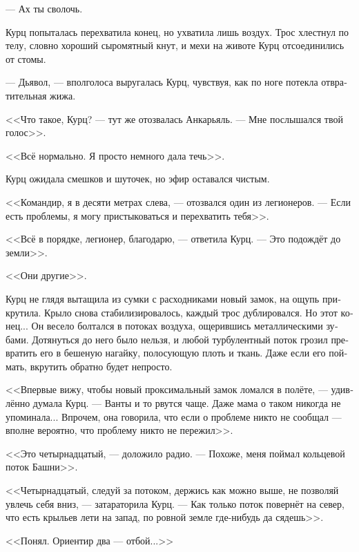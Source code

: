 \documentclass[a4paper,10pt,fleqn]{book}\usepackage{polyglossia}\setdefaultlanguage[babelshorthands=true]{russian}\setotherlanguage{english}\defaultfontfeatures{Ligatures=TeX,Mapping=tex-text}\usepackage{xcolor}\newcommand{\ml}[3]{#2}
\begin{document}
--- Ах ты сволочь.

Курц попыталась перехватила конец, но ухватила лишь воздух.
Трос хлестнул по телу, словно хороший сыромятный кнут, и мехи на животе Курц отсоединились от стомы.

--- Дьявол, --- вполголоса выругалась Курц, чувствуя, как по ноге потекла отвратительная жижа.

\ml{$0$}
{<<Что такое, Курц? --- тут же отозвалась Анкарьяль.}
{``Whazzup, Kurz?'' Angaralle immediately answered.}
\ml{$0$}
{--- Мне послышался твой голос>>.}
{``I thought I heard your voice.''}

\ml{$0$}
{<<Всё нормально.}
{``I'm all right.}
\ml{$0$}
{Я просто немного дала течь>>.}
{Just sprung a leak.''}

Курц ожидала смешков и шуточек, но эфир оставался чистым.

<<Командир, я в десяти метрах слева, --- отозвался один из легионеров.
--- Если есть проблемы, я могу пристыковаться и перехватить тебя>>.

<<Всё в порядке, легионер, благодарю, --- ответила Курц.
--- Это подождёт до земли>>.

\ml{$0$}
{<<Они другие>>.}
{They're different.}

Курц не глядя вытащила из сумки с расходниками новый замок, на ощупь прикрутила.
Крыло снова стабилизировалось, каждый трос дублировался.
Но этот конец...
Он весело болтался в потоках воздуха, ощерившись металлическими зубами.
Дотянуться до него было нельзя, и любой турбулентный поток грозил превратить его в бешеную нагайку, полосующую плоть и ткань.
Даже если его поймать, вкрутить обратно будет непросто.

<<Впервые вижу, чтобы новый проксимальный замок ломался в полёте, --- удивлённо думала Курц.
--- Ванты и то рвутся чаще.
Даже мама о таком никогда не упоминала...
\ml{$0$}
{Впрочем, она говорила, что если о проблеме никто не сообщал --- вполне вероятно, что проблему никто не пережил>>.}
{\textit{She told, however, if the problem were not reported, the problem more than likely were not outlived.}}

<<Это четырнадцатый, --- доложило радио.
--- Похоже, меня поймал кольцевой поток Башни>>.

<<Четырнадцатый, следуй за потоком, держись как можно выше, не позволяй увлечь себя вниз, --- затараторила Курц.
--- Как только поток повернёт на север, что есть крыльев лети на запад, по ровной земле где-нибудь да сядешь>>.

\ml{$0$}
{<<Понял.}
{``Roger that.}
\ml{$0$}
{Ориентир два --- отбой...>>}
{Beacon two is off---''}
\end{document}
